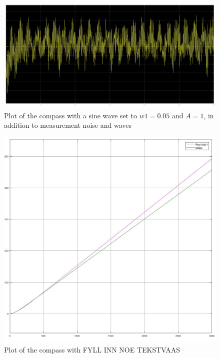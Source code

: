 \begin{figure}[H]
    \centering
    \includegraphics[width=1\textwidth]{Plots/1c_w005.jpg}
    \caption{Plot of the compass with a sine wave set to $w1 = 0.05$ and $A=1$, in addition to measurement noise and waves}
    \label{fig: 1c_w005}
\end{figure}

\begin{figure}[H]
    \centering
    \includegraphics[width=1\textwidth]{Plots/1d_compare.jpg}
    \caption{Plot of the compass with FYLL INN NOE TEKSTVAAS}
    \label{fig: 1d_compare}
\end{figure}